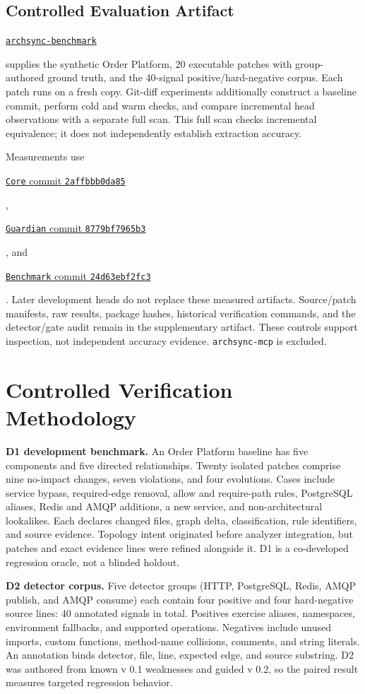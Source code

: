 \documentclass[conference]{IEEEtran}
\newif\ifarchsyncanonymous
\newcommand{\archsyncrepository}[2]{%
  \ifarchsyncanonymous
    \nolinkurl{#1} (blinded)%
  \else
    \href{#2}{\nolinkurl{#1}}%
  \fi
}
\newcommand{\archsynccommit}[4]{%
  \ifarchsyncanonymous
    \texttt{#1} commit \texttt{#4} (blinded artifact)%
  \else
    \href{#2/commit/#3}{\texttt{#1} commit \texttt{#4}}%
  \fi
}
\begin{document}
\subsection{Controlled Evaluation Artifact}

\archsyncrepository{archsync-benchmark}{https://github.com/Little-Boy-s-ArchSync/archsync-benchmark} supplies the synthetic Order Platform, 20 executable patches with group-authored ground truth, and the 40-signal positive/hard-negative corpus. Each patch runs on a fresh copy. Git-diff experiments additionally construct a baseline commit, perform cold and warm checks, and compare incremental head observations with a separate full scan. This full scan checks incremental equivalence; it does not independently establish extraction accuracy.

Measurements use \archsynccommit{Core}{https://github.com/Little-Boy-s-ArchSync/archsync-core}{2affbbb0da859a32b9b9079b4bf718fc7b14993b}{2affbbb0da85}, \archsynccommit{Guardian}{https://github.com/Little-Boy-s-ArchSync/archsync-guardian}{8779bf7965b3bd15f25834f17ca5321c85ae3f43}{8779bf7965b3}, and \archsynccommit{Benchmark}{https://github.com/Little-Boy-s-ArchSync/archsync-benchmark}{24d63ebf2fc3075a1d64f1eaff38cdc0b7f586fb}{24d63ebf2fc3}. Later development heads do not replace these measured artifacts. Source/patch manifests, raw results, package hashes, historical verification commands, and the detector/gate audit remain in the supplementary artifact. These controls support inspection, not independent accuracy evidence. \texttt{archsync-mcp} is excluded.

\section{Controlled Verification Methodology}
\textbf{D1 development benchmark.} An Order Platform baseline has five components and five directed relationships. Twenty isolated patches comprise nine no-impact changes, seven violations, and four evolutions. Cases include service bypass, required-edge removal, allow and require-path rules, PostgreSQL aliases, Redis and AMQP additions, a new service, and non-architectural lookalikes. Each declares changed files, graph delta, classification, rule identifiers, and source evidence. Topology intent originated before analyzer integration, but patches and exact evidence lines were refined alongside it. D1 is a co-developed regression oracle, not a blinded holdout.

\textbf{D2 detector corpus.} Five detector groups (HTTP, PostgreSQL, Redis, AMQP publish, and AMQP consume) each contain four positive and four hard-negative source lines: 40 annotated signals in total. Positives exercise aliases, namespaces, environment fallbacks, and supported operations. Negatives include unused imports, custom functions, method-name collisions, comments, and string literals. An annotation binds detector, file, line, expected edge, and source substring. D2 was authored from known v 0.1 weaknesses and guided v 0.2, so the paired result measures targeted regression behavior.
\end{document}
